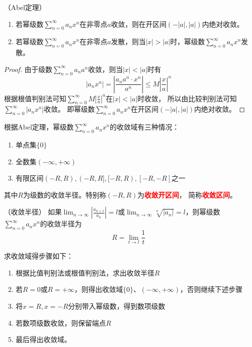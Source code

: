 \begin{theorem}
    （Abel定理）
    \label{th:Abel定理}
    \begin{enumerate}[(1)]
        \item 若幂级数$\displaystyle\sum_{n=0}^\infty a_nx^n$在非零点$a$收敛，则在开区间$(-|a|,|a|)$内绝对收敛。
        \item 若幂级数$\displaystyle\sum_{n=0}^\infty a_nx^n$在非零点$a$发散，则当$|x| > |a|$时，幂级数$\displaystyle\sum_{n=0}^\infty a_nx^n$发散。
    \end{enumerate}
\end{theorem}
\begin{proof}
    由于级数$\displaystyle\sum_{n=0}^\infty a_na^n$收敛，则当$|x| < |a|$时有
    \[ |a_nx^n| = \left|\frac{a_na^n \cdot x^n}{a^n}\right| \leq M\left|\frac{x}{a}\right|^n  \]
    根据根值判别法可知$\displaystyle\sum_{n=0}^\infty M\left|\frac{x}{a}\right|^n$在$|x| < |a|$时收敛，
    所以由比较判别法可知$\displaystyle\sum_{n=0}^\infty |a_nx^n|$收敛。
    即幂级数$\displaystyle\sum_{n=0}^\infty a_nx^n$在开区间$(-|a|,|a|)$内绝对收敛。
\end{proof}
根据Abel定理，幂级数$\displaystyle\sum_{n=0}^\infty a_nx^n$的收敛域有三种情况：
\begin{enumerate}
    \item 单点集$\{0\}$
    \item 全数集$(-\infty,+\infty)$
    \item 有限区间$(-R,R), (-R,R], [-R,R), [-R,-R]$之一
\end{enumerate}
其中$R$为级数的收敛半径。特别称$(-R,R)$为\textcolor{red}{\textbf{\textsf{收敛开区间}}}，
简称\textcolor{red}{\textbf{\textsf{收敛区间}}}。

\begin{theorem}
    （收敛半径）
    如果$\displaystyle\lim_{n\to\infty}\left| \frac{a_{n+1}}{a_n} \right| = l$或$\displaystyle\lim_{n\to\infty}\sqrt[n]{|a_n|}=l$，则幂级数
    $\displaystyle\sum_{n=0}^\infty a_nx^n$的收敛半径为
    \[ R = \lim_{t \to l} \frac{1}{t} \]
\end{theorem}

求收敛域得步骤如下：
\begin{enumerate}[(1)]
    \item 根据比值判别法或根值判别法，求出收敛半径$R$
    \item 若$R=0$或$R=+\infty$，则得出收敛域$\{0\}$、$(-\infty,+\infty)$，否则继续下述步骤
    \item 将$x=R,x=-R$分别带入幂级数，得到数项级数
    \item 若数项级数收敛，则保留端点$R$
    \item 最后得出收敛域。
\end{enumerate}

